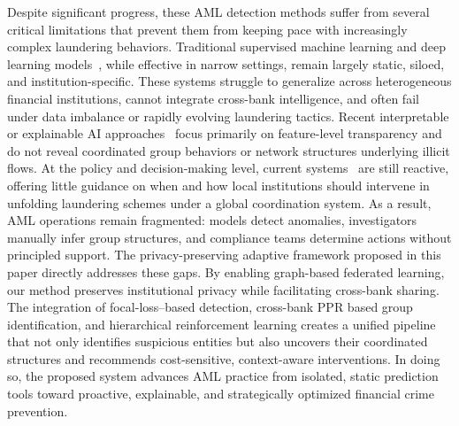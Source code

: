 \documentclass[11pt,english]{article}
\begin{document}
Despite significant progress, these AML detection methods suffer from several critical limitations that prevent them from keeping pace with increasingly complex laundering behaviors. Traditional supervised machine learning and deep learning models~\parencite{pettersson2022combating, alotibi2022money, jensen2023fighting, lokanan2024predicting, chen2018machine}, while effective in narrow settings, remain largely static, siloed, and institution-specific. These systems struggle to generalize across heterogeneous financial institutions, cannot integrate cross-bank intelligence, and often fail under data imbalance or rapidly evolving laundering tactics. Recent interpretable or explainable AI approaches~\parencite{chen2018machine, han2020artificial, kute2024explainable, kute2022explainable} focus primarily on feature-level transparency and do not reveal coordinated group behaviors or network structures underlying illicit flows. At the policy and decision-making level, current systems~\parencite{ross2007money, unger2009dodge, helgesson2016involuntary, mccarthy2015modeling} are still reactive, offering little guidance on when and how local institutions should intervene in unfolding laundering schemes under a global coordination system. As a result, AML operations remain fragmented: models detect anomalies, investigators manually infer group structures, and compliance teams determine actions without principled support. The privacy-preserving adaptive framework proposed in this paper directly addresses these gaps. By enabling graph-based federated learning, our method preserves institutional privacy while facilitating cross-bank sharing. The integration of focal-loss–based detection, cross-bank PPR based group identification, and hierarchical reinforcement learning creates a unified pipeline that not only identifies suspicious entities but also uncovers their coordinated structures and recommends cost-sensitive, context-aware interventions. In doing so, the proposed system advances AML practice from isolated, static prediction tools toward proactive, explainable, and strategically optimized financial crime prevention.







\end{document}
